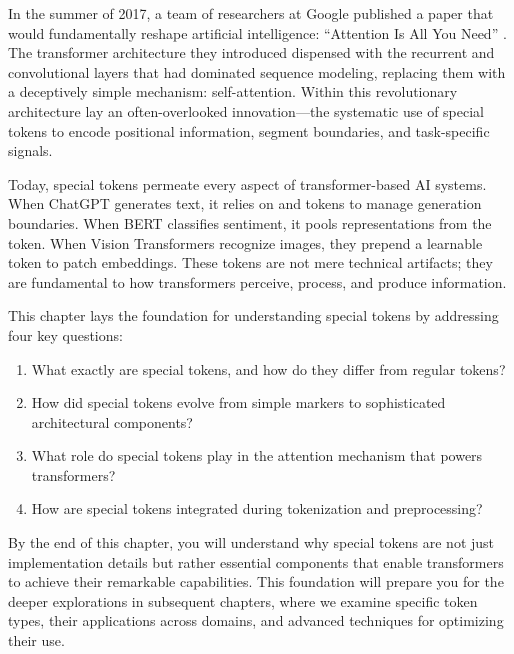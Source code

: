 In the summer of 2017, a team of researchers at Google published a paper that would fundamentally reshape artificial intelligence: ``Attention Is All You Need'' \citep{vaswani2017attention}. The transformer architecture they introduced dispensed with the recurrent and convolutional layers that had dominated sequence modeling, replacing them with a deceptively simple mechanism: self-attention. Within this revolutionary architecture lay an often-overlooked innovation---the systematic use of special tokens to encode positional information, segment boundaries, and task-specific signals.
\begin{comment}
Feedback: This is a great hook. To strengthen it, you could add a sentence that hints at why this "often-overlooked innovation" was so critical. For example: "While the attention mechanism received the most acclaim, it was the humble special token that provided the structure necessary for attention to be truly effective." This helps justify the book's focus right away.
\end{comment}

Today, special tokens permeate every aspect of transformer-based AI systems. When ChatGPT generates text, it relies on \sos{} and \eos{} tokens to manage generation boundaries. When BERT classifies sentiment, it pools representations from the \cls{} token. When Vision Transformers recognize images, they prepend a learnable \cls{} token to patch embeddings. These tokens are not mere technical artifacts; they are fundamental to how transformers perceive, process, and produce information.

This chapter lays the foundation for understanding special tokens by addressing four key questions:
\begin{enumerate}
\item What exactly are special tokens, and how do they differ from regular tokens?
\item How did special tokens evolve from simple markers to sophisticated architectural components?
\item What role do special tokens play in the attention mechanism that powers transformers?
\item How are special tokens integrated during tokenization and preprocessing?
\end{enumerate}

By the end of this chapter, you will understand why special tokens are not just implementation details but rather essential components that enable transformers to achieve their remarkable capabilities. This foundation will prepare you for the deeper explorations in subsequent chapters, where we examine specific token types, their applications across domains, and advanced techniques for optimizing their use.
\begin{comment}
Feedback: The closing paragraph is a bit boilerplate ("This foundation will prepare you..."). Consider making it more active and benefit-oriented for the reader. For example: "Armed with this foundational knowledge, you will be equipped to not only use existing models more effectively but also to begin designing and implementing your own novel token strategies."
\end{comment}